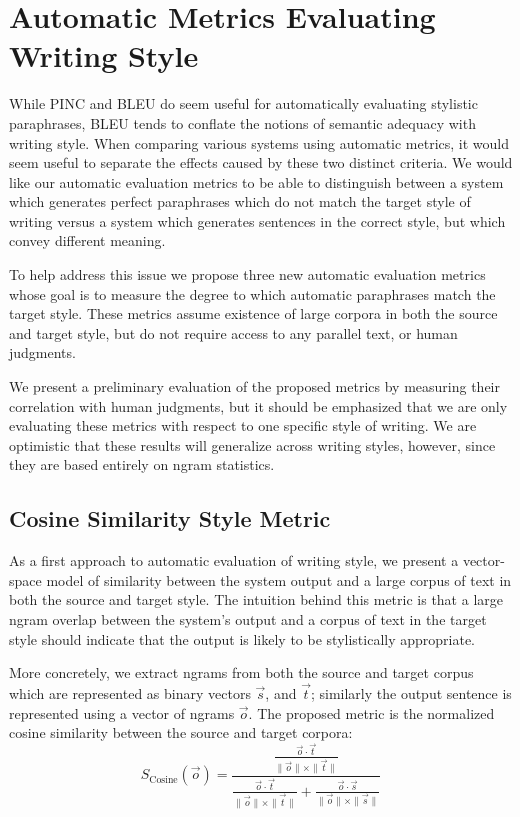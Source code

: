 \documentclass[10pt,a5paper,twoside]{article}
\begin{document}
\section{Automatic Metrics Evaluating Writing Style}
While PINC and BLEU do seem useful for automatically evaluating stylistic paraphrases, BLEU tends to conflate the notions of
semantic adequacy with writing style.  When comparing various systems using automatic metrics, it would seem useful
to separate the effects caused by these two distinct criteria.  We would like our automatic evaluation metrics to be able to distinguish
between a system which generates perfect paraphrases which do not match the target style of writing versus a system which
generates sentences in the correct style, but which convey different meaning.

To help address this issue we propose three new automatic evaluation metrics whose goal is to measure the degree to which
automatic paraphrases match the target style.  These metrics assume existence of large corpora in both the source and
target style, but do not require access to any parallel text, or human judgments.

We present a preliminary evaluation of the proposed metrics by measuring their correlation with human judgments, but
it should be emphasized that we are only evaluating these metrics with respect to one specific style of writing.  We
are optimistic that these results will generalize across writing styles, however, since they are based entirely
on ngram statistics.

\subsection{Cosine Similarity Style Metric}
As a first approach to automatic evaluation of writing style, we present a vector-space model of similarity between the system
output and a large corpus of text in both the source and target style.  The intuition behind this metric is that  a large ngram
overlap between the system's output and a corpus of text in the target style should indicate that the
output is likely to be stylistically appropriate.

More concretely, we extract ngrams from both the source and target corpus which are represented as binary
vectors $\vec{s}$, and $\vec{t}$; similarly the output sentence is represented using a vector of
ngrams $\vec{o}$.  
The proposed metric is the normalized cosine similarity between the source and target corpora:
\[
S_{\text{Cosine}}(\vec{o}) = \frac{\frac{\vec{o} \cdot \vec{t}}{\|\vec{o}\| \times \|\vec{t}\|}}{\frac{\vec{o} \cdot \vec{t}}{\|\vec{o}\| \times \|\vec{t}\|} + \frac{\vec{o} \cdot \vec{s}}{\|\vec{o}\| \times \|\vec{s}\|}}
\]
\end{document}
